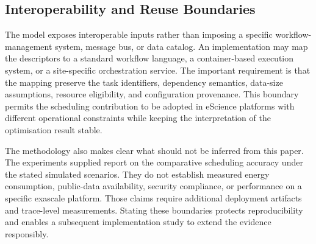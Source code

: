 \subsection{Interoperability and Reuse Boundaries}

The model exposes interoperable inputs rather than imposing a specific workflow-management system, message bus, or data catalog. An implementation may map the descriptors to a standard workflow language, a container-based execution system, or a site-specific orchestration service. The important requirement is that the mapping preserve the task identifiers, dependency semantics, data-size assumptions, resource eligibility, and configuration provenance. This boundary permits the scheduling contribution to be adopted in eScience platforms with different operational constraints while keeping the interpretation of the optimisation result stable.

The methodology also makes clear what should not be inferred from this paper. The experiments supplied  report on the comparative scheduling accuracy under the stated simulated scenarios. They do not establish measured energy consumption, public-data availability, security compliance, or performance on a specific exascale platform. Those claims require additional deployment artifacts and trace-level measurements. Stating these boundaries protects reproducibility and enables a subsequent implementation study to extend the evidence responsibly.
